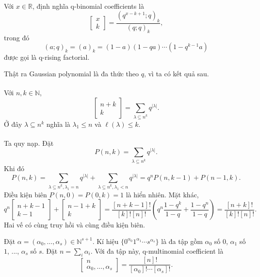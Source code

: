 \documentclass[11pt]{article}
\begin{document}
\paragraph{}
Với \(x\in\mathbb R\), định nghĩa q-binomial coefficients là
\[
  \left[\begin{matrix}x\\ k\end{matrix}\right]
  =\frac{(q^{x-k+1};q)_k}{(q;q)_k},
\]
trong đó
\[
  (a;q)_k=(a)_k=(1-a)(1-qa)\cdots(1-q^{k-1}a)
\]
được gọi là q-rising factorial.

Thật ra Gaussian polynomial là đa thức theo \(q\), vì ta có kết quả sau.

\paragraph{}
Với \(n,k\in\mathbb N\),
\[
  \left[\begin{matrix} n+k\\ k\end{matrix}\right]
  =\sum_{\lambda\subseteq n^k} q^{|\lambda|}.
\]
Ở đây \(\lambda\subseteq n^k\) nghĩa là \(\lambda_1\le n\) và
\(\ell(\lambda)\le k\).

\paragraph{}
Ta quy nạp. Đặt
\[
  P(n,k)=\sum_{\lambda\subseteq n^k}q^{|\lambda|}.
\]
Khi đó
\[
  P(n,k)=
  \sum_{\lambda\subseteq n^k,\lambda_1=n}q^{|\lambda|}
  +\sum_{\lambda\subseteq n^k,\lambda_1<n}q^{|\lambda|}
  =q^nP(n,k-1)+P(n-1,k).
\]
Điều kiện biên \(P(n,0)=P(0,k)=1\) là hiển nhiên. Mặt khác,
\[
  q^n\left[\begin{matrix}n+k-1\\ k-1\end{matrix}\right]
  +\left[\begin{matrix}n-1+k\\ k\end{matrix}\right]
  =
  \frac{[n+k-1]!}{[k]![n]!}
  \left(q^n\frac{1-q^k}{1-q}+\frac{1-q^n}{1-q}\right)
  =
  \frac{[n+k]!}{[k]![n]!}.
\]
Hai vế có cùng truy hồi và cùng điều kiện biên.

Đặt \(\alpha=(\alpha_0,\ldots,\alpha_s)\in\mathbb N^{s+1}\). Kí hiệu
\(\{0^{\alpha_0}1^{\alpha_1}\cdots s^{\alpha_s}\}\) là đa tập gồm
\(\alpha_0\) số \(0\), \(\alpha_1\) số \(1\), ..., \(\alpha_s\) số \(s\).
Đặt \(n=\sum_i\alpha_i\). Với đa tập này, q-multinomial coefficient là
\[
  \left[\begin{matrix} n\\ \alpha_0,\ldots,\alpha_s\end{matrix}\right]
  =
  \frac{[n]!}{[\alpha_0]!\cdots[\alpha_s]!}.
\]
\end{document}
